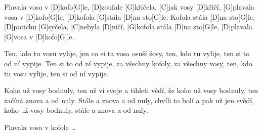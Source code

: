 
\sloka
[G]Plavala vosa v [D]kofo[G]le, [D]zoufale [G]křičela, [C]jak vosy [D]křičí,
[G]plavala vosa v [D]kofo[G]le, [D]kofola [G]stála [D]na sto[G]le.
Kofola stála [D]na sto[G]le, [D]potichu [G]syčela, [C]nebyla [D]ničí,
[G]kofola stála [D]na sto[G]le, [D]plavala [G]vosa v [D]kofo[G]le.

\sloka
Ten, kdo tu vosu vylije, jen co si ta vosa osuší šosy,
ten, kdo tu vylije, ten si to od ní vypije.
Ten si to od ní vypije, za všechny kofoly, za všechny vosy,
ten, kdo tu vosu vylije, ten si od ní vypije.

\sloka
Koho už vosy bodnuly, ten už ví svoje a tihleti vědí,
že koho už vosy bodnuly, ten začíná znova a od nuly.
Stále a znova a od nuly, chvíli to bolí a pak už jen svědí,
koho už vosy bodnuly, stále a znova a od nuly.

\sloka
Plavala vosa v kofole …
